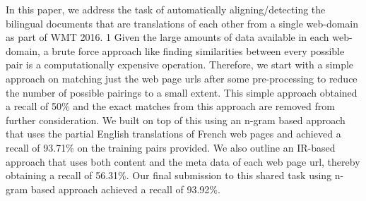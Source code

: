 In this paper, we address the task of automatically aligning/detecting the bilingual documents that are translations of each other from a single web-domain as part of WMT 2016. 1 Given the large amounts of data available in each web-domain, a brute force approach like finding similarities between every possible pair is a computationally expensive operation. Therefore, we start with a simple approach on matching just the web page urls after some pre-processing to reduce the number of possible pairings to a small extent. This simple approach obtained a recall of 50\% and the exact matches from this approach are removed from further consideration. We built on top of this using an n-gram based approach that uses the partial English translations of French web pages and achieved a recall of 93.71\% on the training pairs provided. We also outline an IR-based approach that uses both content and the meta data of each web page url, thereby obtaining a recall of 56.31\%. Our final submission to this shared task using n-gram based approach achieved a recall of 93.92\%.
